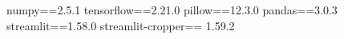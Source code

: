 numpy==2.5.1
tensorflow==2.21.0
pillow==12.3.0
pandas==3.0.3
streamlit==1.58.0
streamlit-cropper== 1.59.2